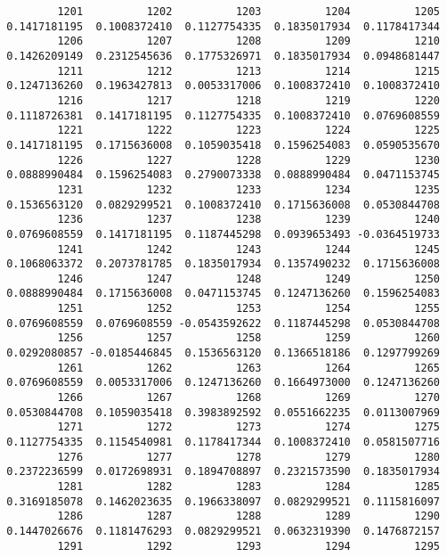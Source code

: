 \documentclass[
  letterpaper,
  DIV=11,
  numbers=noendperiod]{scrreprt}
\begin{document}
\begin{verbatim}
         1201          1202          1203          1204          1205 
 0.1417181195  0.1008372410  0.1127754335  0.1835017934  0.1178417344 
         1206          1207          1208          1209          1210 
 0.1426209149  0.2312545636  0.1775326971  0.1835017934  0.0948681447 
         1211          1212          1213          1214          1215 
 0.1247136260  0.1963427813  0.0053317006  0.1008372410  0.1008372410 
         1216          1217          1218          1219          1220 
 0.1118726381  0.1417181195  0.1127754335  0.1008372410  0.0769608559 
         1221          1222          1223          1224          1225 
 0.1417181195  0.1715636008  0.1059035418  0.1596254083  0.0590535670 
         1226          1227          1228          1229          1230 
 0.0888990484  0.1596254083  0.2790073338  0.0888990484  0.0471153745 
         1231          1232          1233          1234          1235 
 0.1536563120  0.0829299521  0.1008372410  0.1715636008  0.0530844708 
         1236          1237          1238          1239          1240 
 0.0769608559  0.1417181195  0.1187445298  0.0939653493 -0.0364519733 
         1241          1242          1243          1244          1245 
 0.1068063372  0.2073781785  0.1835017934  0.1357490232  0.1715636008 
         1246          1247          1248          1249          1250 
 0.0888990484  0.1715636008  0.0471153745  0.1247136260  0.1596254083 
         1251          1252          1253          1254          1255 
 0.0769608559  0.0769608559 -0.0543592622  0.1187445298  0.0530844708 
         1256          1257          1258          1259          1260 
 0.0292080857 -0.0185446845  0.1536563120  0.1366518186  0.1297799269 
         1261          1262          1263          1264          1265 
 0.0769608559  0.0053317006  0.1247136260  0.1664973000  0.1247136260 
         1266          1267          1268          1269          1270 
 0.0530844708  0.1059035418  0.3983892592  0.0551662235  0.0113007969 
         1271          1272          1273          1274          1275 
 0.1127754335  0.1154540981  0.1178417344  0.1008372410  0.0581507716 
         1276          1277          1278          1279          1280 
 0.2372236599  0.0172698931  0.1894708897  0.2321573590  0.1835017934 
         1281          1282          1283          1284          1285 
 0.3169185078  0.1462023635  0.1966338097  0.0829299521  0.1115816097 
         1286          1287          1288          1289          1290 
 0.1447026676  0.1181476293  0.0829299521  0.0632319390  0.1476872157 
         1291          1292          1293          1294          1295 

\end{verbatim}
\end{document}
